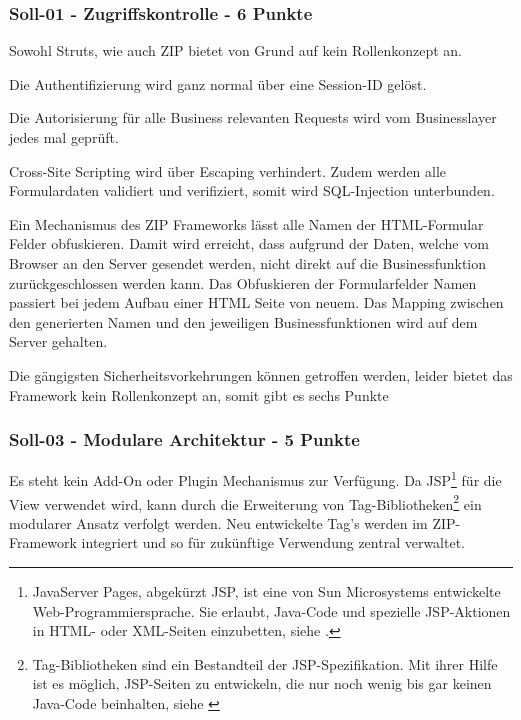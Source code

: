   \subsubsection{Soll-01 - Zugriffskontrolle - 6 Punkte}
  
  Sowohl Struts, wie auch \ac{ZIP} bietet von Grund auf kein Rollenkonzept an.
  
  Die Authentifizierung wird ganz normal über eine Session-ID gelöst.
  
  Die Autorisierung für alle Business relevanten Requests wird vom
  Businesslayer jedes mal geprüft.
  
  Cross-Site Scripting wird über Escaping verhindert. Zudem werden alle
  Formulardaten validiert und verifiziert, somit wird SQL-Injection unterbunden.
  
  Ein Mechanismus des \ac{ZIP} Frameworks lässt alle Namen der
  \ac{HTML}-Formular Felder obfuskieren. Damit wird erreicht, dass aufgrund
  der Daten, welche vom Browser an den Server gesendet werden, nicht direkt
  auf die Businessfunktion zurückgeschlossen werden kann. Das Obfuskieren der
  Formularfelder Namen passiert bei jedem Aufbau einer HTML Seite von neuem. Das
  Mapping zwischen den generierten Namen und den jeweiligen Businessfunktionen
  wird auf dem Server gehalten.
  
  Die gängigsten Sicherheitsvorkehrungen können getroffen werden, leider bietet
  das Framework kein Rollenkonzept an, somit gibt es sechs Punkte
  
  \subsubsection{Soll-03 - Modulare Architektur - 5 Punkte}
  
  Es steht kein Add-On oder Plugin Mechanismus zur Verfügung. Da
  \ac{JSP}\footnote{JavaServer Pages, abgekürzt JSP, ist eine von Sun
  Microsystems entwickelte Web-Programmiersprache. Sie erlaubt, Java-Code und
  spezielle JSP-Aktionen in HTML- oder XML-Seiten einzubetten, siehe
  \cite{JavaServerPages}.} für die View verwendet wird, kann durch die
  Erweiterung von Tag-Bibliotheken\footnote{Tag-Bibliotheken sind ein
  Bestandteil der JSP-Spezifikation. Mit ihrer Hilfe ist es möglich, JSP-Seiten
  zu entwickeln, die nur noch wenig bis gar keinen Java-Code beinhalten, siehe
  \cite{TagLibrary}} ein modularer Ansatz verfolgt werden. Neu entwickelte
  Tag's werden im ZIP-Framework integriert und so für zukünftige Verwendung
  zentral verwaltet.
  
